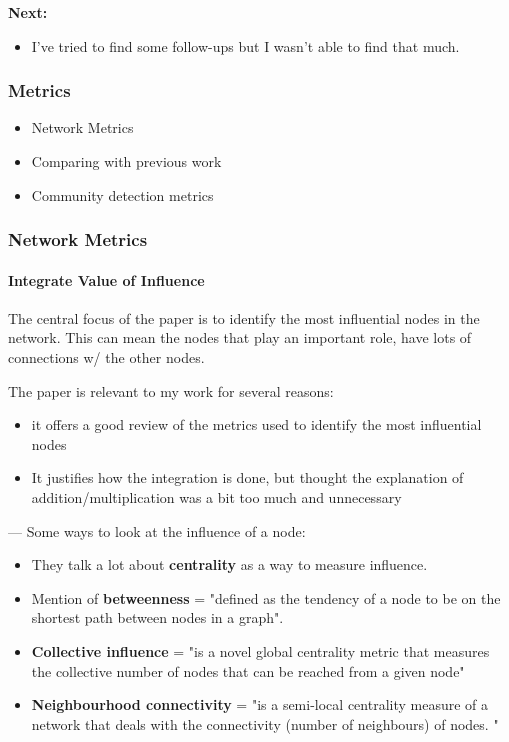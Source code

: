\textbf{Next:}
\begin{itemize}
    \item I've tried to find some follow-ups but I wasn't able to find that much.
\end{itemize}


\subsubsection{Metrics}

\begin{itemize}
    \item Network Metrics
    \item Comparing with previous work
    \item Community detection metrics 
\end{itemize}

\subsubsection{Network Metrics}

\paragraph{Integrate Value of Influence}

The central focus of the paper is to identify the most influential nodes in the network. This can mean the nodes that play an important role, have lots of connections w/ the other nodes. 

The paper is relevant to my work for several reasons:
\begin{itemize}
    \item it offers a good review of the metrics used to identify the most influential nodes
    \item  It justifies how the integration is done, but thought the explanation of addition/multiplication was a bit too much and unnecessary
\end{itemize}

--- 
Some ways to look at the influence of a node: 

\begin{itemize}
    \item They talk a lot about \textbf{centrality} as a way to measure influence.
    \item Mention of \textbf{betweenness} = "defined as the tendency of a node to be on the shortest path between nodes in a graph".
    \item \textbf{Collective influence} =  "is a novel global centrality metric that measures the collective number of nodes that can be reached from a given node" 
    \item\textbf{ Neighbourhood connectivity} = "is a semi-local centrality measure of a network that deals with the connectivity (number of neighbours) of nodes. "

\end{itemize}

